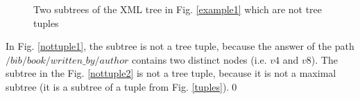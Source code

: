 \begin{example}
\begin{figure}[H]
    \centering
	\caption[Two subtrees of the XML tree]{Two subtrees of the XML tree in Fig. \ref{example1} which are not tree tuples}
    \label{nottuples}
\end{figure}

In Fig. \ref{nottuple1}, the subtree is not a tree tuple, because the answer of the path $/bib/book/written\_by/author$ contains two distinct nodes (i.e. $v4$ and $v8$). The subtree in the Fig. \ref{nottuple2} is not a tree tuple, because it is not a maximal subtree (it is a subtree of a tuple from Fig. \ref{tuples}).\qed

\end{example}


